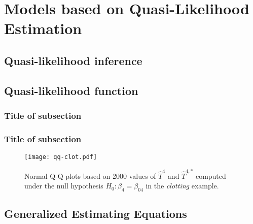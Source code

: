 \chapter{Models based on Quasi-Likelihood Estimation}

\fancyhead[RO,LE]{\thepage}

\setlength{\parskip}{0.5pt}

\bigskip

\section{Quasi-likelihood inference} 
\noindent

\section{Quasi-likelihood function}
\noindent

\subsection{}
\noindent


\subsection{Title of subsection}
\noindent


\subsection{Title of subsection}
\noindent

\begin{figure}[!h]\centering
	\texttt{[image: qq-clot.pdf]}
	
	\caption{\label{qq-clot}Normal Q-Q plots based on 2000 values of $\widehat{T}^4$ and $\widehat{T}^{4,*}$ computed under the null hypothesis $H_0\!:\beta_4=\beta_{04}$ in the \emph{clotting} example.}
\end{figure}

\section{Generalized Estimating Equations}
\noindent